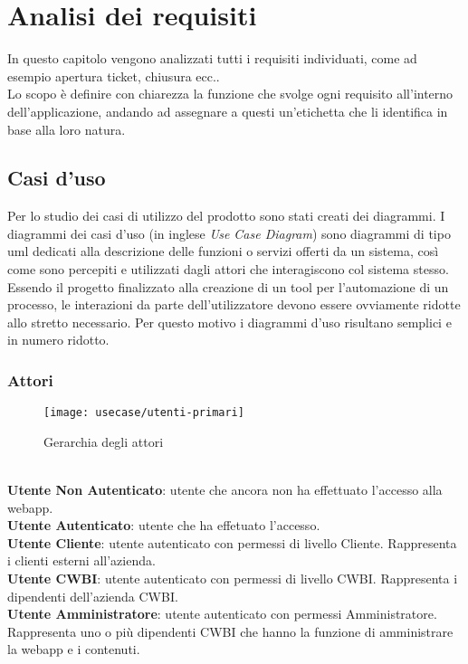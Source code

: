 \chapter{Analisi dei requisiti}
\label{cap:analisi-requisiti}

In questo capitolo vengono analizzati tutti i requisiti individuati, come ad esempio apertura ticket, chiusura ecc..\\
Lo scopo è definire con chiarezza la funzione che svolge ogni requisito all'interno dell'applicazione, andando  ad assegnare a questi un'etichetta che li identifica in base alla  loro natura.

\section{Casi d'uso}

Per lo studio dei casi di utilizzo del prodotto sono stati creati dei diagrammi.
I diagrammi dei casi d'uso (in inglese \emph{Use Case Diagram}) sono diagrammi di tipo \gls{uml} dedicati alla descrizione delle funzioni o servizi offerti da un sistema, così come sono percepiti e utilizzati dagli attori che interagiscono col sistema stesso.
Essendo il progetto finalizzato alla creazione di un tool per l'automazione di un processo, le interazioni da parte dell'utilizzatore devono essere ovviamente ridotte allo stretto necessario. Per questo motivo i diagrammi d'uso risultano semplici e in numero ridotto.

\subsection{Attori}


\begin{figure}[H]
    \centering 
    \texttt{[image: usecase/utenti-primari]} 
    \caption{Gerarchia degli attori}
\end{figure}

\\
\textbf{Utente Non Autenticato}: utente che ancora non ha effettuato l'accesso alla webapp. 
\\
\textbf{Utente Autenticato}: utente che ha effetuato l'accesso.  
\\ 
\textbf{Utente Cliente}: utente autenticato con permessi di livello Cliente. Rappresenta i clienti esterni all'azienda. 
\\ 
\textbf{Utente CWBI}: utente autenticato con permessi di livello CWBI. Rappresenta i dipendenti dell'azienda CWBI. 
\\
\textbf{Utente Amministratore}: utente autenticato con permessi Amministratore. Rappresenta uno o più dipendenti CWBI che hanno la funzione di amministrare la webapp e i contenuti.  \\


